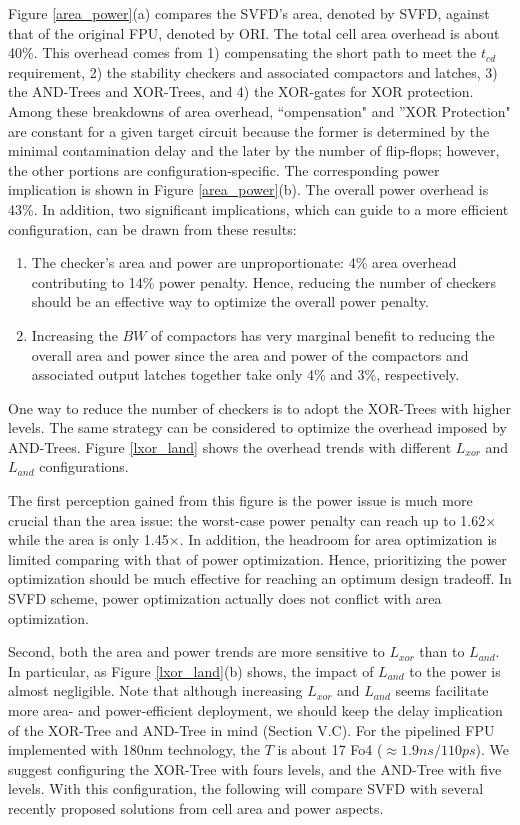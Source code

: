 Figure \ref{area_power}(a) compares the SVFD's area, denoted by SVFD, against that of the original FPU, denoted by ORI. The total cell area overhead is about 40\%. This overhead comes from 1) compensating the short path to meet the $t_{cd}$ requirement, 2) the stability checkers and associated compactors  and latches, 3) the AND-Trees and XOR-Trees, and 4) the XOR-gates for XOR protection. Among these breakdowns of area overhead, “ompensation" and ”XOR Protection" are constant for a given target circuit because the former is determined by the minimal contamination delay and the later by the number of flip-flops; however, the other portions are configuration-specific. The corresponding power implication is shown in Figure \ref{area_power}(b). The overall power overhead is 43\%. In addition, two significant implications, which can guide to a more efficient configuration, can be drawn from these results:
\begin{enumerate}
  \item  The checker's area and power are unproportionate:  4\% area overhead   contributing to 14\% power penalty. Hence, reducing the number of checkers should   be an effective way to optimize the  overall power penalty.

  \item  Increasing the $BW$ of compactors has very marginal benefit to reducing the overall area and power since the area and power of the compactors and associated output latches together take only 4\% and 3\%, respectively.
\end{enumerate}

One way to reduce the number of checkers is to adopt the XOR-Trees with higher levels. The same strategy can be considered to optimize the overhead imposed by AND-Trees. Figure \ref{lxor_land} shows the overhead trends with different $L_{xor}$ and $L_{and}$ configurations.

The first perception gained from this figure is the power issue is much more crucial than the area issue: the worst-case power penalty can reach up to 1.62$\times$ while the area is only 1.45$\times$. In addition, the headroom for area optimization is limited comparing with that of power optimization. Hence, prioritizing the power optimization should be much effective for reaching an optimum design tradeoff. In SVFD scheme, power optimization actually does not conflict with area optimization.

Second, both the area and power trends are more sensitive to $L_{xor}$ than to $L_{and}$. In particular, as Figure \ref{lxor_land}(b) shows, the impact of $L_{and}$ to the power is almost negligible. Note that although increasing $L_{xor}$ and $L_{and}$ seems facilitate more area- and power-efficient deployment, we should keep the delay implication of the XOR-Tree and AND-Tree in mind (Section V.C). For the pipelined FPU implemented with 180nm technology, the $T$ is about 17 Fo4 ($\approx 1.9ns/110ps$). We suggest configuring the XOR-Tree with fours levels, and the AND-Tree with five levels. With this configuration, the following will compare SVFD with several recently proposed solutions from cell area and power aspects.

